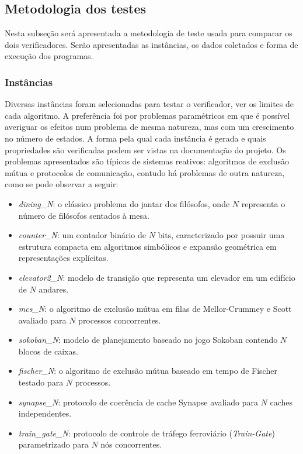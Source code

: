 \documentclass[cic,tc]{infufrgs}
\begin{document}
	\subsection{Metodologia dos testes}
	\label{sec:metodologia_t}
	Nesta subseção será apresentada a metodologia de teste usada para comparar os dois verificadores. Serão apresentadas as instâncias, os dados coletados e forma de execução dos programas.
	
	\subsubsection{Instâncias}
	Diversas instâncias foram selecionadas para testar o verificador, ver os limites de cada algoritmo. A preferência foi por problemas paramétricos em que é possível averiguar os efeitos num problema de mesma natureza, mas com um crescimento no número de estados. A forma pela qual cada instância é gerada e quais propriedades são verificadas podem ser vistas na documentação do projeto. Os problemas apresentados são típicos de sistemas reativos: algoritmos de exclusão mútua e protocolos de comunicação, contudo há problemas de outra natureza, como se pode observar a seguir:
	\begin{itemize}
		\item \textit{dining\_N}: o clássico problema do jantar dos filósofos, onde $N$ representa o número de filósofos sentados à mesa.
		\item \textit{counter\_N}: um contador binário de $N$ bits, caracterizado por possuir uma estrutura compacta em algoritmos simbólicos e expansão geométrica em representações explícitas.
		\item \textit{elevator2\_N}: modelo de transição que representa um elevador em um edifício de $N$ andares.
		\item \textit{mcs\_N}: o algoritmo de exclusão mútua em filas de Mellor-Crummey e Scott avaliado para $N$ processos concorrentes.
		\item \textit{sokoban\_N}: modelo de planejamento baseado no jogo Sokoban contendo $N$ blocos de caixas.
		\item \textit{fischer\_N}: o algoritmo de exclusão mútua baseado em tempo de Fischer testado para $N$ processos.
		\item \textit{synapse\_N}: protocolo de coerência de cache Synapse avaliado para $N$ caches independentes.
		\item \textit{train\_gate\_N}: protocolo de controle de tráfego ferroviário (\textit{Train-Gate}) parametrizado para $N$ nós concorrentes.
	\end{itemize}
	
\end{document}
